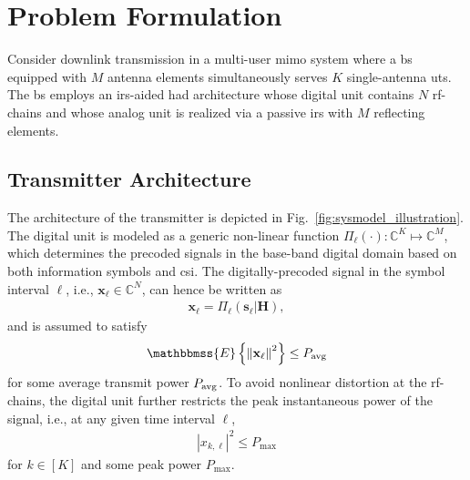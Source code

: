 \documentclass[12pt,draftclsnofoot,onecolumn,journal]{IEEEtran}
\newcommand{\brc}[1]{ \left( #1 \right) }
\newcommand{\dbc}[1]{ \left[ #1 \right] }
\newcommand{\Ex}[1]{ \mathbbmss{E}\left\lbrace #1 \right\rbrace }
\newcommand{\norm}[1]{ \left\Vert #1 \right\Vert}
\newcommand{\abs}[1]{ \left\vert #1 \right\vert}
\begin{document}
\section{Problem Formulation}
Consider downlink transmission in a multi-user \ac{mimo} system where a \ac{bs} equipped with $M$ antenna elements simultaneously serves $K$ single-antenna \acp{ut}. The \ac{bs} employs an \ac{irs}-aided \ac{had} architecture whose digital unit contains $N$ \ac{rf}-chains and whose analog unit is realized via a passive \ac{irs} with $M$ reflecting elements.%

%

\subsection{Transmitter Architecture}
The architecture of the transmitter is depicted in Fig.~\ref{fig:sysmodel_illustration}. The digital unit is modeled as a generic non-linear function $\Pi_\ell\brc{\cdot}: \mathbb C^{K} \mapsto \mathbb C^{M}$, which determines the precoded signals in the base-band digital domain based on both information symbols and \ac{csi}. The digitally-precoded signal in the symbol interval $\ell$, i.e., $\mathbf{x}_\ell \in \mathbb{C}^N$, can hence be written as 
\begin{align}
\mathbf x_\ell = \Pi_\ell\brc{ \mathbf s_\ell  \vert \mathbf H},
\end{align}
and is assumed to satisfy 
\begin{align}
	\Ex{ \norm{\mathbf x_\ell}^2 } \leq P_{\rm avg}
\end{align}
for some average transmit power $P_{\rm avg}$. To avoid nonlinear distortion at the \ac{rf}-chains, the digital unit further restricts the peak instantaneous power of the signal, i.e., at any given time interval $\ell$,
\begin{align}
\abs{x_{k,\ell}}^2 \leq P_{\max}
\end{align}
for $k\in\dbc{K}$ and some peak power $P_{\max}$.
\end{document}
